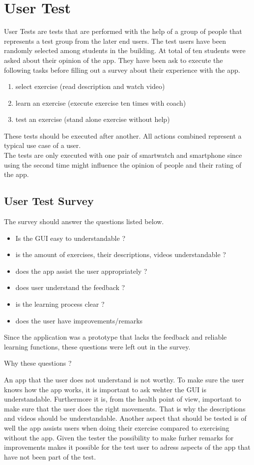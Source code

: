 \section{User Test}
User Tests are tests that are performed with the help of a group of people that represents a test group from the later end users. The test users have been randomly selected among students in the building. At total of ten students were asked about their opinion of the app. They have been ask to execute the following tasks before filling out a survey about their experience with the app.
\begin{enumerate}
\item select exercise (read description and watch video)
\item learn an exercise (execute exercise ten times with coach)
\item test an exercise (stand alone exercise without help)
\end{enumerate}

These tests should be executed after another. All actions combined represent a typical use case of a user.\\
The tests are only executed with one pair of smartwatch and smartphone since using the second time might influence the opinion of people and their rating of the app.

\subsection{User Test Survey}
The survey should answer the questions listed below.
\begin{itemize}
\item Is the GUI easy to understandable ?
\item is the amount of exercises, their descriptions, videos understandable ?
\item does the app assist the user appropriately ?
\item does user understand the feedback ?
\item is the learning process clear ?
\item does the user have improvements/remarks
\end{itemize}
Since the application was a prototype that lacks the feedback and reliable learning functions, these questions were left out in the survey.\\
\begin{Large}
Why these questions ?\\
\end{Large}
An app that the user does not understand is not worthy. To make sure the user knows how the app works, it is important to ask wehter the GUI is understandable.
Furthermore it is, from the health point of view, important to make sure that the user does the right movements. That is why the descriptions and videos should be understandable. Another aspect that should be tested is of well the app assists users when doing their exercise compared to exercising without the app.
Given the tester the possibility to make furher remarks for improvements makes it possible for the test user to adress aspects of the app that have not been part of the test.

